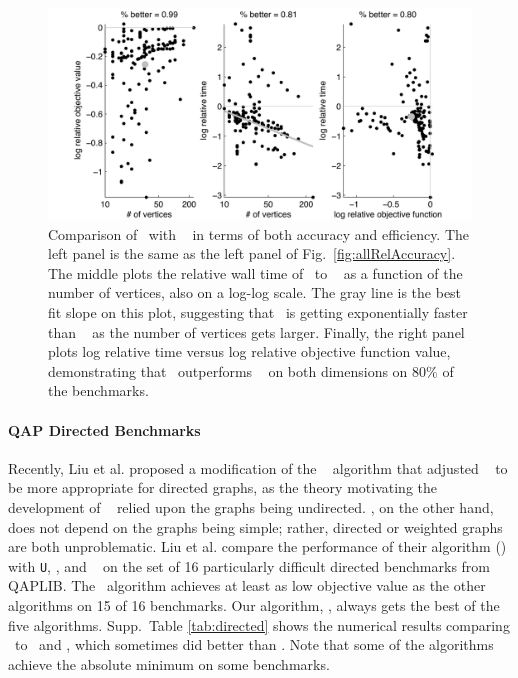 \documentclass{article} %
\begin{document}
\begin{figure}[htbp]
	\centering
		\includegraphics[width=0.5\linewidth]{../figs/allPathCompare.pdf}
	\caption{Comparison of \FAQ\  with \Path~ in terms of both accuracy and efficiency.  The left panel is the same as the left panel of Fig.\ \ref{fig:allRelAccuracy}.  The middle plots the relative wall time of \FAQ\  to \Path~ as a function of the number of vertices, also on a log-log scale.  The gray line is the best fit slope on this plot, suggesting that \FAQ\  is getting exponentially faster than \Path~ as the number of vertices gets larger.  Finally, the right panel plots log relative time versus log relative objective function value, demonstrating that \FAQ\  outperforms \Path~ on both dimensions on $80\%$ of the benchmarks.}
	\label{fig:tradeoff}
\end{figure}
\vspace{-10pt}




\vspace{-5pt}
\paragraph{QAP Directed Benchmarks}
\label{sub:directed}


Recently, Liu et al. \cite{Liu2012} proposed a modification of the \Path~ algorithm that adjusted \Path~ to be more appropriate for directed graphs, as the theory motivating the development of \Path~ relied upon the graphs being undirected.  \FAQ, on the other hand, does not depend on the graphs being simple; rather, directed or weighted graphs are both unproblematic. 
Liu et al. compare the performance of their algorithm (\Epath) with \texttt{U}, \Qcv, and \Grad~ on the set of 16 particularly difficult directed benchmarks from QAPLIB.  The \Epath~algorithm achieves at least as low objective value as the other algorithms on 15 of 16 benchmarks.  Our algorithm, \FAQ, always gets the best of the five algorithms.  Supp.\  Table \ref{tab:directed} shows the numerical results comparing \FAQ\  to \Epath~and \Grad, which sometimes did better than \Epath.  Note that some of the algorithms achieve the absolute minimum on some benchmarks.  
\end{document}
